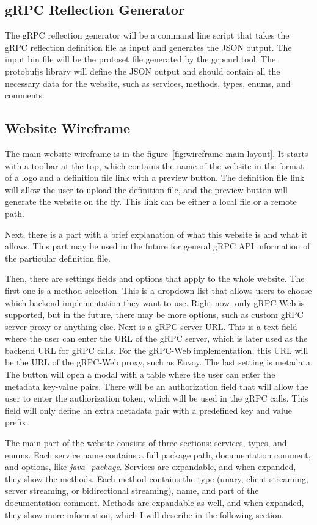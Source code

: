 \subsection{gRPC Reflection Generator}
The gRPC reflection generator will be a command line script that takes the gRPC reflection definition file as input and generates the JSON output.
The input bin file will be the protoset file generated by the grpcurl tool.
The protobufjs library will define the JSON output and should contain all the necessary data for the website, such as services, methods, types, enums, and comments.

\subsection{Website Wireframe}
The main website wireframe is in the figure~\ref{fig:wireframe-main-layout}.
It starts with a toolbar at the top, which contains the name of the website in the format of a logo and a definition file link with a preview button.
The definition file link will allow the user to upload the definition file, and the preview button will generate the website on the fly.
This link can be either a local file or a remote path.

Next, there is a part with a brief explanation of what this website is and what it allows.
This part may be used in the future for general gRPC API information of the particular definition file.

Then, there are settings fields and options that apply to the whole website.
The first one is a method selection.
This is a dropdown list that allows users to choose which backend implementation they want to use.
Right now, only gRPC-Web is supported, but in the future, there may be more options, such as custom gRPC server proxy or anything else.
Next is a gRPC server URL\@.
This is a text field where the user can enter the URL of the gRPC server, which is later used as the backend URL for gRPC calls.
For the gRPC-Web implementation, this URL will be the URL of the gRPC-Web proxy, such as Envoy.
The last setting is metadata.
The button will open a modal with a table where the user can enter the metadata key-value pairs.
There will be an authorization field that will allow the user to enter the authorization token, which will be used in the gRPC calls.
This field will only define an extra metadata pair with a predefined key and value prefix.

The main part of the website consists of three sections: services, types, and enums.
Each service name contains a full package path, documentation comment, and options, like \textit{java\_package}.
Services are expandable, and when expanded, they show the methods.
Each method contains the type (unary, client streaming, server streaming, or bidirectional streaming), name, and part of the documentation comment.
Methods are expandable as well, and when expanded, they show more information, which I will describe in the following section.

